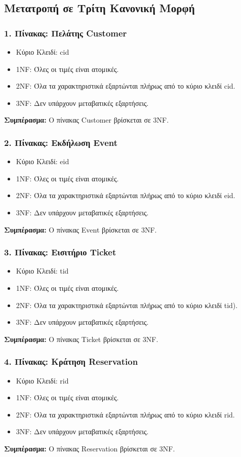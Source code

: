 \documentclass{article}
\begin{document}
\subsection*{Μετατροπή σε Τρίτη Κανονική Μορφή}
\subsubsection*{1. Πίνακας: Πελάτης Customer}
\begin{itemize}
    \item Κύριο Κλειδί: cid
    \item 1NF: Όλες οι τιμές είναι ατομικές.
    \item 2NF: Όλα τα χαρακτηριστικά εξαρτώνται πλήρως από το κύριο κλειδί cid.
    \item 3NF: Δεν υπάρχουν μεταβατικές εξαρτήσεις.
\end{itemize}
\textbf{Συμπέρασμα:} Ο πίνακας Customer βρίσκεται σε 3NF.

\subsubsection*{2. Πίνακας: Εκδήλωση Event}
\begin{itemize}
    \item Κύριο Κλειδί: eid
    \item 1NF: Όλες οι τιμές είναι ατομικές.
    \item 2NF: Όλα τα χαρακτηριστικά εξαρτώνται πλήρως από το κύριο κλειδί eid.
    \item 3NF: Δεν υπάρχουν μεταβατικές εξαρτήσεις.
\end{itemize}
\textbf{Συμπέρασμα:} Ο πίνακας Event βρίσκεται σε 3NF.

\subsubsection*{3. Πίνακας: Εισιτήριο Ticket}
\begin{itemize}
    \item Κύριο Κλειδί: tid
    \item 1NF: Όλες οι τιμές είναι ατομικές.
    \item 2NF: Όλα τα χαρακτηριστικά εξαρτώνται πλήρως από το κύριο κλειδί tid).
    \item 3NF: Δεν υπάρχουν μεταβατικές εξαρτήσεις.
\end{itemize}
\textbf{Συμπέρασμα:} Ο πίνακας Ticket βρίσκεται σε 3NF.

\subsubsection*{4. Πίνακας: Κράτηση Reservation}
\begin{itemize}
    \item Κύριο Κλειδί: rid
    \item 1NF: Όλες οι τιμές είναι ατομικές.
    \item 2NF: Όλα τα χαρακτηριστικά εξαρτώνται πλήρως από το κύριο κλειδί rid.
    \item 3NF: Δεν υπάρχουν μεταβατικές εξαρτήσεις.
\end{itemize}
\textbf{Συμπέρασμα:} Ο πίνακας Reservation βρίσκεται σε 3NF.
\end{document}
